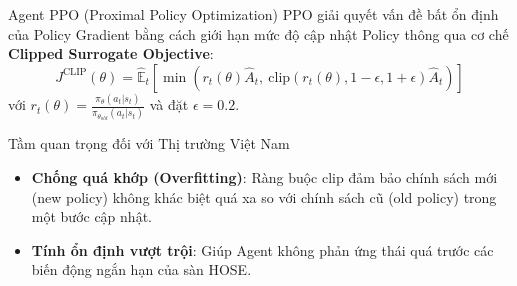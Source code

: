 \documentclass[10pt,aspectratio=169]{beamer}
\begin{document}
\begin{frame}{Agent PPO (Proximal Policy Optimization)}
  PPO giải quyết vấn đề bất ổn định của Policy Gradient bằng cách giới hạn mức độ cập nhật Policy thông qua cơ chế \textbf{Clipped Surrogate Objective}:
  $$J^{\text{CLIP}}(\theta) = \hat{\mathbb{E}}_t\left[\min\left(r_t(\theta)\hat{A}_t,\ \text{clip}(r_t(\theta), 1-\epsilon, 1+\epsilon)\hat{A}_t\right)\right]$$
  với $r_t(\theta) = \frac{\pi_\theta(a_t|s_t)}{\pi_{\theta_{old}}(a_t|s_t)}$ và đặt $\epsilon = 0.2$.
  
  \begin{exampleblock}{Tầm quan trọng đối với Thị trường Việt Nam}
    \begin{itemize}
      \item \textbf{Chống quá khớp (Overfitting)}: Ràng buộc $\text{clip}$ đảm bảo chính sách mới (new policy) không khác biệt quá xa so với chính sách cũ (old policy) trong một bước cập nhật.
      \item \textbf{Tính ổn định vượt trội}: Giúp Agent không phản ứng thái quá trước các biến động ngắn hạn của sàn HOSE.
    \end{itemize}
  \end{exampleblock}
\end{frame}
\end{document}
